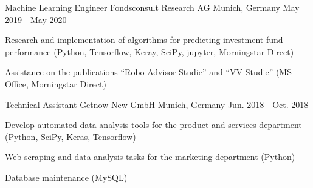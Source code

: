\begin{cventries}

\cventry
{Machine Learning Engineer} %
{Fondsconsult Research AG} %
{Munich, Germany} %
{May 2019 - May 2020} %
{ %
\begin{cvitems}
\item {Research and implementation of algorithms for predicting  investment fund performance (Python, Tensorflow, Keray, SciPy, jupyter, Morningstar Direct)}
\item {Assistance on the publications ``Robo-Advisor-Studie'' and ``VV-Studie'' (MS Office, Morningstar Direct)}
\end{cvitems}
}


\cventry
{Technical Assistant} %
{Getnow New GmbH} %
{Munich, Germany} %
{Jun. 2018 - Oct. 2018} %
{ %
\begin{cvitems}
\item {Develop automated data analysis tools for the product and services department (Python, SciPy, Keras, Tensorflow)}
\item {Web scraping and data analysis tasks for the marketing department (Python)}
\item {Database maintenance (MySQL)}
\end{cvitems}
}

\end{cventries}